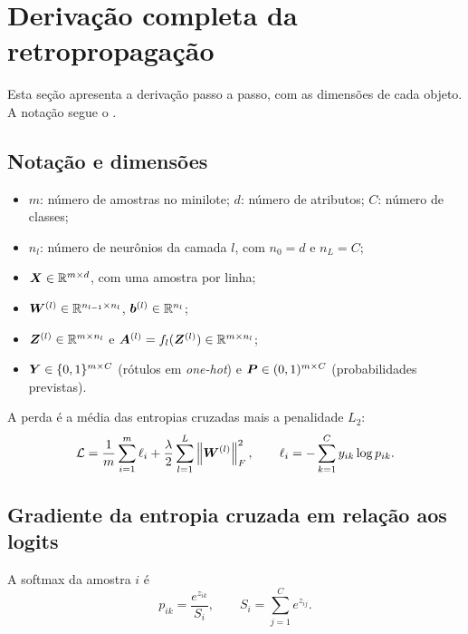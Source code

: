 ﻿%
\appendix
\section{Derivação completa da retropropagação}
\label{ap:backprop}

Esta seção apresenta a derivação passo a passo, com as dimensões de cada objeto. A notação segue o
.

\subsection{Notação e dimensões}

\begin{itemize}
	\item $m$: número de amostras no minilote; $d$: número de atributos; $C$: número de classes;
	\item $n_l$: número de neurônios da camada $l$, com $n_0 = d$ e $n_L = C$;
	\item $\bm{X} \in \mathbb{R}^{m\times d}$, com uma amostra por linha;
	\item $\bm{W}^{(l)} \in \mathbb{R}^{n_{l-1}\times n_l}$, $\bm{b}^{(l)} \in \mathbb{R}^{n_l}$;
	\item $\bm{Z}^{(l)} \in \mathbb{R}^{m\times n_l}$ e $\bm{A}^{(l)} = f_l(\bm{Z}^{(l)}) \in \mathbb{R}^{m\times n_l}$;
	\item $\bm{Y} \in \{0,1\}^{m\times C}$ (rótulos em \emph{one-hot}) e $\bm{P} \in (0,1)^{m\times C}$
	      (probabilidades previstas).
\end{itemize}

A perda é a média das entropias cruzadas mais a penalidade $L_2$:
\begin{equation}
	\mathcal{L} = \frac{1}{m}\sum_{i=1}^{m}\ell_i + \frac{\lambda}{2}\sum_{l=1}^{L}\left\|\bm{W}^{(l)}\right\|_F^2,
	\qquad
	\ell_i = -\sum_{k=1}^{C} y_{ik}\log p_{ik}.
	\label{eq:ap-perda}
\end{equation}

\subsection{Gradiente da entropia cruzada em relação aos logits}

A softmax da amostra $i$ é
\begin{equation}
	p_{ik} = \frac{e^{z_{ik}}}{S_i},
	\qquad S_i = \sum_{j=1}^{C} e^{z_{ij}}.
\end{equation}

